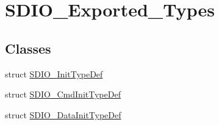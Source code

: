 \hypertarget{group__SDIO__Exported__Types}{
\section{SDIO\_\-Exported\_\-Types}
\label{group__SDIO__Exported__Types}
}
\subsection*{Classes}
\begin{DoxyCompactItemize}
\item 
struct \hyperlink{structSDIO__InitTypeDef}{SDIO\_\-InitTypeDef}
\item 
struct \hyperlink{structSDIO__CmdInitTypeDef}{SDIO\_\-CmdInitTypeDef}
\item 
struct \hyperlink{structSDIO__DataInitTypeDef}{SDIO\_\-DataInitTypeDef}
\end{DoxyCompactItemize}
